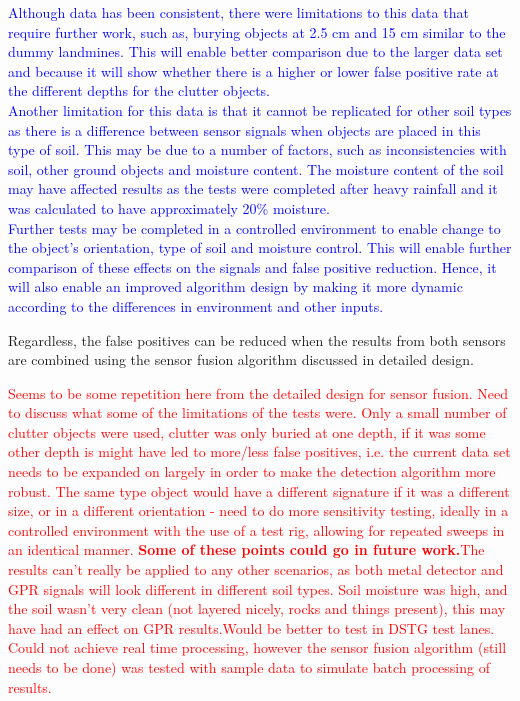 \documentclass[main.tex]{subfiles}
\begin{document}
\textcolor{blue}{Although data has been consistent, there were limitations to this data that require further work, such as, burying objects at 2.5 cm and 15 cm similar to the dummy landmines. This will enable better comparison due to the larger data set and because it will show whether there is a higher or lower false positive rate at the different depths for the clutter objects. \\
Another limitation for this data is that it cannot be replicated for other soil types as there is a difference between sensor signals when objects are placed in this type of soil. This may be due to a number of factors, such as inconsistencies with soil, other ground objects and moisture content. The moisture content of the soil may have affected results as the tests were completed after heavy rainfall and it was calculated to have approximately 20\% moisture. \\
Further tests may be completed in a controlled environment to enable change to the object's orientation, type of soil and moisture control. This will enable further comparison of these effects on the signals and false positive reduction. Hence, it will also enable an improved algorithm design by making it more dynamic according to the differences in environment and other inputs. 
}

Regardless, the false positives can be reduced when the results from both sensors are combined using the sensor fusion algorithm discussed in detailed design.


\textcolor{red}{Seems to be some repetition here from the detailed design for sensor fusion. Need to discuss what some of the limitations of the tests were. Only a small number of clutter objects were used, clutter was only buried at one depth, if it was some other depth is might have led to more/less false positives, i.e. the current data set needs to be expanded on largely in order to make the detection algorithm more robust. The same type object would have a different signature if it was a different size, or in a different orientation - need to do more sensitivity testing, ideally in a controlled environment with the use of a test rig, allowing for repeated sweeps in an identical manner. \textbf{Some of these points could go in future work.}The results can't really be applied to any other scenarios, as both metal detector and GPR signals will look different in different soil types. Soil moisture was high, and the soil wasn't very clean (not layered nicely, rocks and things present), this may have had an effect on GPR results.Would be better to test in DSTG test lanes. Could not achieve real time processing, however the sensor fusion algorithm (still needs to be done) was tested with sample data to simulate batch processing of results.}
\end{document}
